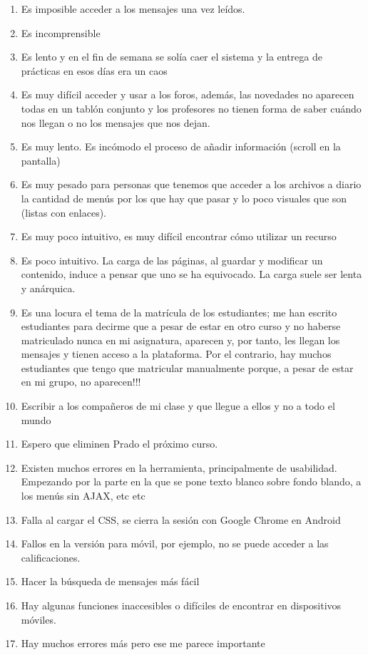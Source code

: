 \begin{enumerate}
\item Es imposible acceder a los mensajes una vez leídos.
\item Es incomprensible
\item Es lento y en el fin de semana se solía caer el sistema y la entrega de prácticas en esos días era un caos
\item Es muy difícil acceder y usar a los foros, además, las novedades no aparecen todas en un tablón conjunto y los profesores no tienen forma de saber cuándo nos llegan o no los mensajes que nos dejan.
\item Es muy lento. Es incómodo el proceso de añadir información (scroll en la pantalla)
\item Es muy pesado para personas que tenemos que acceder a los archivos a diario la cantidad de menús por los que hay que pasar y lo poco visuales que son (listas con enlaces).
\item Es muy poco intuitivo, es muy difícil encontrar cómo utilizar un recurso
\item Es poco intuitivo. La carga de las páginas, al guardar y modificar un contenido, induce a pensar que uno se ha equivocado. La carga suele ser lenta y anárquica.
\item Es una locura el tema de la matrícula de los estudiantes; me han escrito estudiantes para decirme que a pesar de estar en otro curso y no haberse matriculado nunca en mi asignatura, aparecen y, por tanto, les llegan los mensajes y tienen acceso a la plataforma. Por el contrario, hay muchos estudiantes que tengo que matricular manualmente porque, a pesar de estar en mi grupo, no aparecen!!! 
\item Escribir a los compañeros de mi clase y que llegue a ellos y no a todo el mundo
\item Espero que eliminen Prado el próximo curso.
\item Existen muchos errores en la herramienta, principalmente de usabilidad. Empezando por la parte en la que se pone texto blanco sobre fondo blando, a los menús sin AJAX, etc etc
\item Falla al cargar el CSS, se cierra la sesión con Google Chrome en Android
\item Fallos en la versión para móvil, por ejemplo, no se puede acceder a las calificaciones.
\item Hacer la búsqueda de mensajes más fácil
\item Hay algunas funciones inaccesibles o difíciles de encontrar en dispositivos móviles.
\item Hay muchos errores más pero ese me parece importante

\end{enumerate}
